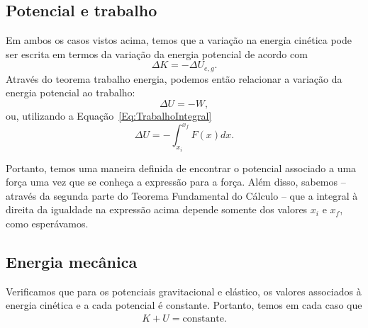 \subsection{Potencial e trabalho}

Em ambos os casos vistos acima, temos que a variação na energia cinética pode ser escrita em termos da variação da energia potencial de acordo com
\begin{equation}
  \Delta K = - \Delta U_{e,g}.
\end{equation}
%
Através do teorema trabalho energia, podemos então relacionar a variação da energia potencial ao trabalho:
\begin{equation}
  \Delta U = - W,
\end{equation}
%
ou, utilizando a Equação~\eqref{Eq:TrabalhoIntegral}
\begin{equation}\label{Eq:CalculoDoPotencial}
  \Delta U = - \int_{x_i}^{x_f} F(x) dx.
\end{equation}

Portanto, temos uma maneira definida de encontrar o potencial associado a uma força uma vez que se conheça a expressão para a força. Além disso, sabemos -- através da segunda parte do Teorema Fundamental do Cálculo -- que a integral à direita da igualdade na expressão acima depende somente dos valores $x_i$ e $x_f$, como esperávamos.

\subsection{Energia mecânica}

Verificamos que para os potenciais gravitacional e elástico, os valores associados à energia cinética e a cada potencial é constante. Portanto, temos em cada caso que
\begin{align}
  K + U = \textrm{constante}.
\end{align}

